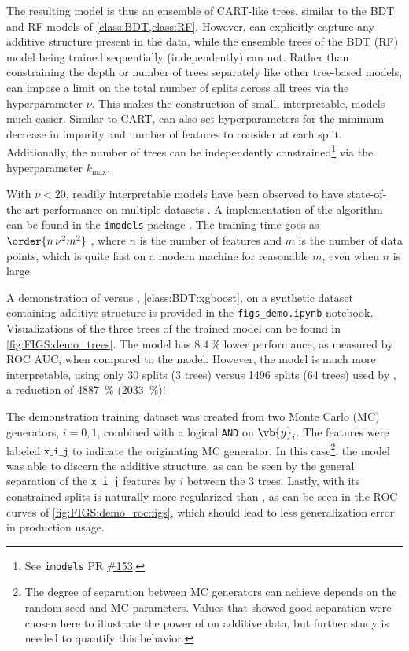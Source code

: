 The resulting \figs model is thus an ensemble of CART-like trees,
similar to the BDT and RF models of \cref{class:BDT,class:RF}.
However, \figs can explicitly capture any additive structure present in the data,
while the ensemble trees of the BDT (RF) model being trained sequentially (independently) can not.
Rather than constraining the depth or number of trees separately like other tree-based models,
\figs can impose a limit on the total number of splits across all trees via the hyperparameter $\nu$.
This makes the construction of small, interpretable, models much easier.
Similar to CART, \figs can also set hyperparameters for
the minimum decrease in impurity and
number of features to consider at each split.
Additionally, the number of trees can  be independently constrained\footnote{See
\texttt{imodels} PR \href{https://github.com/csinva/imodels/pull/153}{\#153}.} via
the hyperparameter $k_{\text{max}}$.

With $\nu < 20$, readily interpretable \figs models have been observed
to have state-of-the-art performance on multiple datasets \cite{FIGS}.
A \python implementation of the \figs algorithm can be found in the \texttt{imodels} package \cite{imodels}.
The \figs training time goes as $\order{n \, \nu^{2} m^{2}}$ \cite{FIGS},
where $n$ is the number of features and $m$ is the number of data points,
which is quite fast on a modern machine for reasonable $m$, even when $n$ is large.

A demonstration of \figs versus \xgboost, \cref{class:BDT:xgboost},
on a synthetic dataset containing additive structure
is provided in the \texttt{figs\_demo.ipynb} \href{https://github.com/mepland/data_science_notes/blob/main/plots/figs_demo.ipynb}{notebook}.
Visualizations of the three trees of the trained \figs model can be found in \cref{fig:FIGS:demo_trees}.
The \figs model has $\SI{8.4}{\percent}$ lower performance, as measured by ROC AUC, when compared to the \xgboost model.
However, the \figs model is much more interpretable,
using only \num{30} splits (\num{3} trees) versus \num{1496} splits (\num{64} trees) used by \xgboost,
a reduction of \SI{4887}{\percent} (\SI{2033}{\percent})!

The demonstration training dataset was created from two Monte Carlo (MC) generators, $i=0,1$,
combined with a logical \texttt{AND} on $\vb{y}_{i}$.
The features were labeled $\texttt{x\_i\_j}$ to indicate the originating MC generator.
In this case\footnote{The degree of separation between MC generators
\figs can achieve depends on the random seed and MC parameters.
Values that showed good separation were chosen here to illustrate
the power of \figs on additive data,
but further study is needed to quantify this behavior.},
the \figs model was able to discern the additive structure,
as can be seen by the general separation of the \texttt{x\_i\_j} features by $i$ between the \num{3} trees.
Lastly, with its constrained splits \figs is naturally more regularized than \xgboost,
as can be seen in the ROC curves of \cref{fig:FIGS:demo_roc:figs},
which should lead to less generalization error in production usage.

